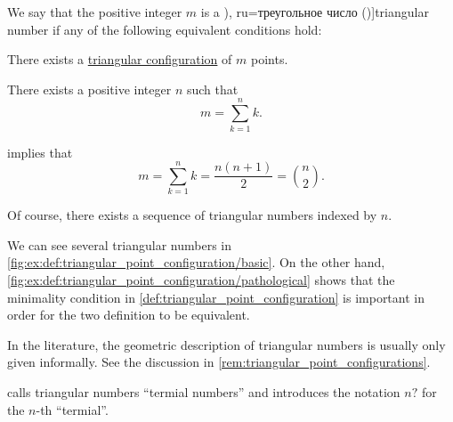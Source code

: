 \begin{definition}\label{def:triangular_number}
  We say that the positive integer \( m \) is a \term[en=triangular number (\cite[1]{Deza2012FigurateNumbers}), ru=треугольное число (\cite[14]{Розенфельд1963ОсновныеПонятиеГеометрии})]{triangular number} if any of the following equivalent conditions hold:
  \begin{thmenum}
     There exists a \hyperref[def:triangular_point_configuration]{triangular configuration} of \( m \) points.

     There exists a positive integer \( n \) such that
    \begin{equation}\label{eq:def:triangular_number/arithmetic}
      m = \sum_{k=1}^n k.
    \end{equation}
  \end{thmenum}
\end{definition}
\begin{comments}
  \item {} implies that
  \begin{equation*}
    m = \sum_{k=1}^n k = \frac {n(n + 1)} 2 = \binom n 2.
  \end{equation*}

  \item Of course, there exists a sequence of triangular numbers indexed by \( n \).

  \item We can see several triangular numbers in \cref{fig:ex:def:triangular_point_configuration/basic}. On the other hand, \cref{fig:ex:def:triangular_point_configuration/pathological} shows that the minimality condition in \cref{def:triangular_point_configuration} is important in order for the two definition to be equivalent.

  \item In the literature, the geometric description of triangular numbers is usually only given informally. See the discussion in \cref{rem:triangular_point_configurations}.

  \item \Textcite[48]{Knuth1997ArtVol1} calls triangular numbers \enquote{termial numbers} and introduces the notation \( n? \) for the \( n \)-th \enquote{termial}.
\end{comments}
